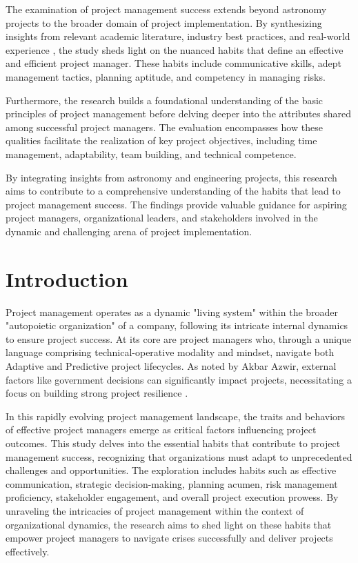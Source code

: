 \documentclass{article}
\begin{document}
The examination of project management success extends beyond astronomy projects to the broader domain of project implementation. By synthesizing insights from relevant academic literature, industry best practices, and real-world experience \cite{Nieto-Rodriguez2021}, the study sheds light on the nuanced habits that define an effective and efficient project manager. These habits include communicative skills, adept management tactics, planning aptitude, and competency in managing risks.

Furthermore, the research builds a foundational understanding of the basic principles of project management before delving deeper into the attributes shared among successful project managers. The evaluation encompasses how these qualities facilitate the realization of key project objectives, including time management, adaptability, team building, and technical competence.

By integrating insights from astronomy and engineering projects, this research aims to contribute to a comprehensive understanding of the habits that lead to project management success. The findings provide valuable guidance for aspiring project managers, organizational leaders, and stakeholders involved in the dynamic and challenging arena of project implementation.

\newpage

\section{Introduction}
Project management operates as a dynamic "living system" within the broader "autopoietic organization" of a company, following its intricate internal dynamics to ensure project success. At its core are project managers who, through a unique language comprising technical-operative modality and mindset, navigate both Adaptive and Predictive project lifecycles. As noted by Akbar Azwir, external factors like government decisions can significantly impact projects, necessitating a focus on building strong project resilience \cite{Lorenzo, Daniele}.

In this rapidly evolving project management landscape, the traits and behaviors of effective project managers emerge as critical factors influencing project outcomes. This study delves into the essential habits that contribute to project management success, recognizing that organizations must adapt to unprecedented challenges and opportunities. The exploration includes habits such as effective communication, strategic decision-making, planning acumen, risk management proficiency, stakeholder engagement, and overall project execution prowess. By unraveling the intricacies of project management within the context of organizational dynamics, the research aims to shed light on these habits that empower project managers to navigate crises successfully and deliver projects effectively.
\end{document}
